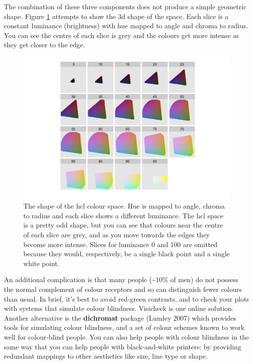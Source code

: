 The combination of these three components does not produce a simple
geometric shape. Figure \ref{fig:hcl} attempts to show the 3d shape of
the space. Each slice is a constant luminance (brightness) with hue
mapped to angle and chroma to radius. You can see the centre of each
slice is grey and the colours get more intense as they get closer to the
edge.

\begin{figure}[htbp]
  \centering
    \includegraphics[width=\linewidth]{diagrams/hcl-space}
  \caption{The shape of the hcl colour space.  Hue is mapped to angle, chroma to radius and each slice shows a different luminance.  The hcl space is a pretty odd shape, but you can see that colours near the centre of each slice are grey, and as you move towards the edges they become more intense.  Slices for luminance 0 and 100 are omitted because they would, respectively, be a single black point and a single white point.}
  \label{fig:hcl}
\end{figure}

An additional complication is that many people (\textasciitilde{}10\% of
men) do not possess the normal complement of colour receptors and so can
distinguish fewer colours than usual.  In brief,
it's best to avoid red-green contrasts, and to check your plots with
systems that simulate colour blindness. Visicheck is one online
solution. Another alternative is the \textbf{dichromat} package (Lumley
2007) which provides tools for simulating colour blindness, and a set of
colour schemes known to work well for colour-blind people. You can also
help people with colour blindness in the same way that you can help
people with black-and-white printers: by providing redundant mappings to
other aesthetics like size, line type or shape.


